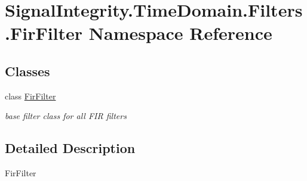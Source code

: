 \hypertarget{namespaceSignalIntegrity_1_1TimeDomain_1_1Filters_1_1FirFilter}{}\section{Signal\+Integrity.\+Time\+Domain.\+Filters.\+Fir\+Filter Namespace Reference}
\label{namespaceSignalIntegrity_1_1TimeDomain_1_1Filters_1_1FirFilter}
\subsection*{Classes}
\begin{DoxyCompactItemize}
\item 
class \hyperlink{classSignalIntegrity_1_1TimeDomain_1_1Filters_1_1FirFilter_1_1FirFilter}{Fir\+Filter}
\begin{DoxyCompactList}\small\item\em base filter class for all F\+IR filters \end{DoxyCompactList}\end{DoxyCompactItemize}


\subsection{Detailed Description}
\begin{DoxyVerb}FirFilter\end{DoxyVerb}
 